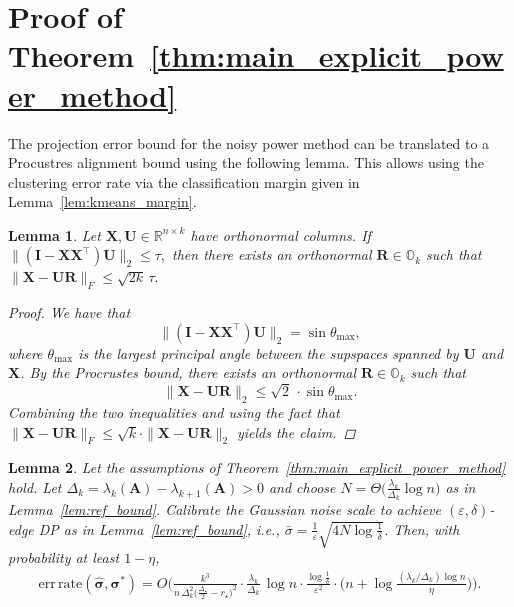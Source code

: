 \documentclass[11pt]{article}
\theoremstyle{plain}
\newtheorem{lemma}{Lemma}[section]
\theoremstyle{definition}
\theoremstyle{remark}
\begin{document}


\section{Proof of Theorem~\ref{thm:main_explicit_power_method}} %
\label{app:power_rate}

The projection error bound for the noisy power method can be translated to a Procustres alignment bound using the following lemma. This allows using the clustering error rate via the classification margin given in Lemma~\ref{lem:kmeans_margin}.



\begin{lemma} \label{lem:projection_to_U}
Let $\mathbf{X},\mathbf{U}\in\mathbb{R}^{n\times k}$ have orthonormal columns.  
If
$
\|(\mathbf{I}-\mathbf{X}\mathbf{X}^\top)\mathbf{U}\|_2 \le \tau,
$
then there exists an orthonormal $\mathbf{R}\in \mathds{O}_{k}$ such that
$
\|\mathbf{X}-\mathbf{U}\mathbf{R}\|_F \le \sqrt{2k}\,\tau.
$
\begin{proof}
We have that 
$$
\|(\mathbf{I}-\mathbf{X}\mathbf{X}^\top)\mathbf{U}\|_2 = \sin\theta_{\max},
$$
where $\theta_{\max}$ is the largest principal angle between the supspaces spanned by $\mathbf{U}$ and $\mathbf{X}$.
By the Procrustes bound, there exists an orthonormal $\mathbf{R} \in \mathbb{O}_{k}$ such that
$$
 \|\mathbf{X}-\mathbf{U}\mathbf{R}\|_2 \le \sqrt{2}\, \cdot \sin\theta_{\max}.
$$
Combining the two inequalities and using the fact that $\|\mathbf{X}-\mathbf{U}\mathbf{R}\|_F \leq \sqrt{k} \cdot \|\mathbf{X}-\mathbf{U}\mathbf{R}\|_2 $ yields the claim.    
\end{proof}
\end{lemma}


\begin{lemma} \label{lem:power_aux}
Let the assumptions of Theorem~\ref{thm:main_explicit_power_method} hold. Let $\Delta_k=\lambda_k(\mathbf{A})-\lambda_{k+1}(\mathbf{A})>0$ and choose $N = \Theta \Big(\frac{\lambda_k}{\Delta_k}\log n\Big)$ as in Lemma~\ref{lem:ref_bound}. Calibrate the Gaussian noise scale to achieve $(\varepsilon,\delta)$-edge DP as in Lemma~\ref{lem:ref_bound}, i.e., $\bar\sigma = \frac{1}{\varepsilon}\sqrt{4N\log\frac{1}{\delta}}$.
Then, with probability at least $1-\eta$,
\begin{equation*}
\begin{aligned}
\mathrm{err\,rate}(\hat{\bm{\sigma}},\bm{\sigma}^\ast)
=  O \Bigg(
\frac{k^3}{n\,\Delta_k^2\bigl(\tfrac{\Delta_\star}{2}-r_\star\bigr)^2}
\cdot
\frac{\lambda_k}{\Delta_k}\,\log n
\cdot
\frac{\log\frac{1}{\delta}}{\varepsilon^2}
\cdot
\Big(n+\log\frac{(\lambda_k/\Delta_k)\log n}{\eta}\Big)
\Bigg).
\end{aligned}
\end{equation*}
\end{lemma}
\end{document}
